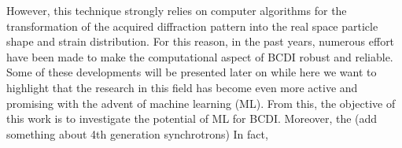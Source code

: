 However, this technique strongly relies on computer algorithms for the transformation of the acquired diffraction pattern into 
the real space particle shape and strain distribution. For this reason, in the past years, numerous effort have been made  
to make the computational aspect of BCDI robust and reliable. Some of these developments will be presented later on while 
here we want to highlight that the research in this field has become even more active and promising with the advent of machine 
learning (ML). From this, the objective of this work is to investigate the potential of ML for BCDI. 
Moreover, the 
(add something about 4th generation synchrotrons)
In fact, 
